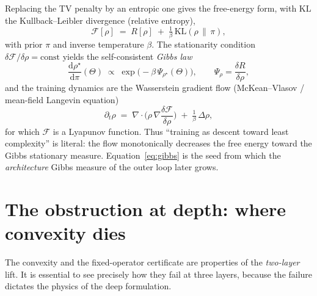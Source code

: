 \documentclass[11pt]{article}
\theoremstyle{definition}
\newcommand{\F}{\mathcal{F}}
\newcommand{\KL}{\mathrm{KL}}
\newcommand{\dd}{\mathrm{d}}
\newcommand{\rhostar}{\rho^{\star}}
\begin{document}
Replacing the TV penalty by an entropic one gives the free-energy form, with $\KL$ the
Kullback--Leibler divergence (relative entropy),
\begin{equation}
\F[\rho] \;=\; R[\rho] \;+\; \tfrac{1}{\beta}\,\KL(\rho\,\|\,\pi),
\label{eq:free-energy}
\end{equation}
with prior $\pi$ and inverse temperature $\beta$. The stationarity condition
$\delta\F/\delta\rho=\mathrm{const}$ yields the self-consistent \emph{Gibbs law}
\begin{equation}
\frac{\dd\rhostar}{\dd\pi}(\Theta)\;\propto\;\exp\!\big(-\beta\,\Psi_{\rhostar}(\Theta)\big),
\qquad \Psi_\rho=\frac{\delta R}{\delta\rho},
\label{eq:gibbs}
\end{equation}
and the training dynamics are the Wasserstein gradient flow (McKean--Vlasov / mean-field
Langevin equation)
\begin{equation}
\partial_t\rho
\;=\;
\nabla\!\cdot\!\Big(\rho\,\nabla\frac{\delta\F}{\delta\rho}\Big)
\;+\;\tfrac{1}{\beta}\,\Delta\rho,
\label{eq:wasserstein-flow}
\end{equation}
for which $\F$ is a Lyapunov function. Thus ``training as descent toward least
complexity'' is literal: the flow monotonically decreases the free energy toward the
Gibbs stationary measure. Equation~\eqref{eq:gibbs} is the seed from which the
\emph{architecture} Gibbs measure of the outer loop later grows.


\section{The obstruction at depth: where convexity dies}
\label{sec:depth-obstruction}

The convexity and the fixed-operator certificate are properties of the \emph{two-layer}
lift. It is essential to see precisely how they fail at three layers, because the failure
dictates the physics of the deep formulation.
\end{document}
